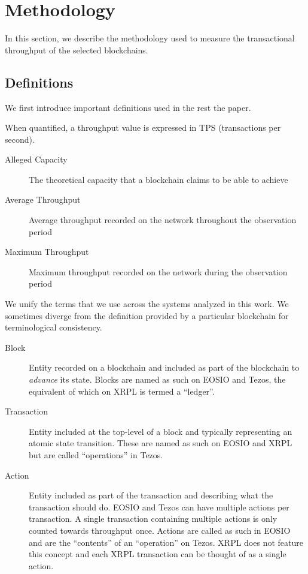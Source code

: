 
\section{Methodology}
\label{sec:methodology}
In this section, we describe the methodology used to measure the transactional throughput of the selected blockchains.

\subsection{Definitions}
We first introduce important definitions used in the rest the paper.

When quantified, a throughput value is expressed in TPS (transactions per second).
\begin{description}
\item[Alleged Capacity] The theoretical capacity that a blockchain claims to be able to achieve
\item[Average Throughput] Average throughput recorded on the network throughout the observation period
\item[Maximum Throughput] Maximum throughput recorded on the network during the observation period
\end{description}

We unify the terms that we use across the systems analyzed in this work.
We sometimes diverge from the definition provided by a particular blockchain for terminological consistency.

\begin{description}
\item[Block] Entity recorded on a blockchain and included as part of the blockchain to \emph{advance} its state. Blocks are named as such on EOSIO and Tezos, the equivalent of which on XRPL is termed  a ``ledger''.
\item[Transaction] Entity included at the top-level of a block and typically representing an atomic state transition. These are named as such on EOSIO and XRPL but are called ``operations'' in Tezos.
\item[Action] Entity included as part of the transaction and describing what the transaction should do. EOSIO and Tezos can have multiple actions per transaction. A single transaction containing multiple actions is only counted towards throughput once.
Actions are called as such in EOSIO and are the ``contents'' of an ``operation'' on Tezos. XRPL does not feature this concept and each XRPL transaction can be thought of as a single action.
\end{description}

